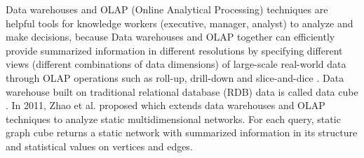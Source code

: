 \documentclass[10pt,journal,compsoc]{IEEEtran}
\begin{document}
\IEEEdisplaynontitleabstractindextext



%
\IEEEpeerreviewmaketitle




Data warehouses and OLAP (Online Analytical Processing) techniques are helpful tools for knowledge workers (executive, manager, analyst) to analyze and make decisions, because Data warehouses and OLAP together can efficiently provide summarized information in different resolutions by specifying different views (different combinations of data dimensions) of large-scale real-world data through OLAP operations such as roll-up, drill-down and slice-and-dice \cite{chaudhuri1997overview}. Data warehouse built on traditional relational database (RDB) data is called data cube \cite{gray1997data}. In 2011, Zhao et al. \cite{zhao2011graph} proposed   which extends data warehouses and OLAP techniques to analyze static multidimensional networks. For each query, static graph cube returns a static network with summarized information in its structure and statistical values on vertices and edges.
\end{document}
